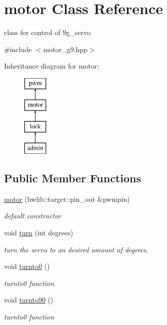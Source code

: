 \hypertarget{classmotor}{}\section{motor Class Reference}
\label{classmotor}


class for control of 9g\+\_\+servo  




{\ttfamily \#include $<$motor\+\_\+g9.\+hpp$>$}

Inheritance diagram for motor\+:\begin{figure}[H]
\begin{center}
\leavevmode
\includegraphics[height=4.000000cm]{classmotor}
\end{center}
\end{figure}
\subsection*{Public Member Functions}
\begin{DoxyCompactItemize}
\item 
\hyperlink{classmotor_a2a03c0b137ceaf886d406f55bc1dfc6d}{motor} (hwlib\+::target\+::pin\+\_\+out \&pwmpin)
\begin{DoxyCompactList}\small\item\em default constructor \end{DoxyCompactList}\item 
void \hyperlink{classmotor_a4d056e4f75a5613ef50a4ae4ed95525d}{turn} (int degrees)
\begin{DoxyCompactList}\small\item\em turn the servo to an desired amount of degrees. \end{DoxyCompactList}\item 
void \hyperlink{classmotor_a942b9474ad3226a035908333d5d09a86}{turnto0} ()
\begin{DoxyCompactList}\small\item\em turnto0 function \end{DoxyCompactList}\item 
void \hyperlink{classmotor_a8983111ce2a6fb60d1ef4d26028981c8}{turnto90} ()
\begin{DoxyCompactList}\small\item\em turnto0 function \end{DoxyCompactList}\end{DoxyCompactItemize}


